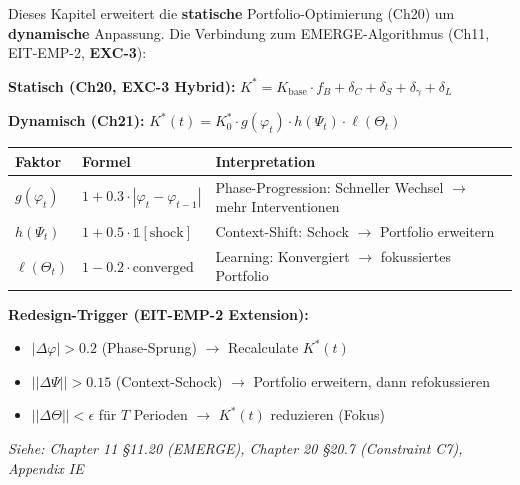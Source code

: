 
\begin{tcolorbox}[colback=blue!5!white, colframe=blue!75!black,
    title=\textbf{Cross-Reference: EMERGE Algorithm \& Dynamic $K^*(t)$ (Chapter 11, 20)}]

Dieses Kapitel erweitert die \textbf{statische} Portfolio-Optimierung (Ch20) um \textbf{dynamische} Anpassung. Die Verbindung zum EMERGE-Algorithmus (Ch11, EIT-EMP-2, \textbf{EXC-3}):

\vspace{0.2cm}
\textbf{Statisch (Ch20, EXC-3 Hybrid):} $K^* = K_{\text{base}} \cdot f_B + \delta_C + \delta_S + \delta_\gamma + \delta_L$

\textbf{Dynamisch (Ch21):} $K^*(t) = K^*_0 \cdot g(\varphi_t) \cdot h(\Psi_t) \cdot \ell(\Theta_t)$

\vspace{0.2cm}
\begin{tabular}{@{}p{3cm}p{4cm}p{5.5cm}@{}}
\textbf{Faktor} & \textbf{Formel} & \textbf{Interpretation} \\
\hline
$g(\varphi_t)$ & $1 + 0.3 \cdot |\varphi_t - \varphi_{t-1}|$ & Phase-Progression: Schneller Wechsel $\to$ mehr Interventionen \\
$h(\Psi_t)$ & $1 + 0.5 \cdot \mathbb{1}[\text{shock}]$ & Context-Shift: Schock $\to$ Portfolio erweitern \\
$\ell(\Theta_t)$ & $1 - 0.2 \cdot \text{converged}$ & Learning: Konvergiert $\to$ fokussiertes Portfolio \\
\end{tabular}

\vspace{0.2cm}
\textbf{Redesign-Trigger (EIT-EMP-2 Extension):}
\begin{itemize}[nosep]
\item $|\Delta\varphi| > 0.2$ (Phase-Sprung) $\to$ Recalculate $K^*(t)$
\item $||\Delta\Psi|| > 0.15$ (Context-Schock) $\to$ Portfolio erweitern, dann refokussieren
\item $||\Delta\Theta|| < \epsilon$ für $T$ Perioden $\to$ $K^*(t)$ reduzieren (Fokus)
\end{itemize}

\vspace{0.2cm}
\textit{Siehe: Chapter 11 §11.20 (EMERGE), Chapter 20 §20.7 (Constraint C7), Appendix IE}
\end{tcolorbox}

